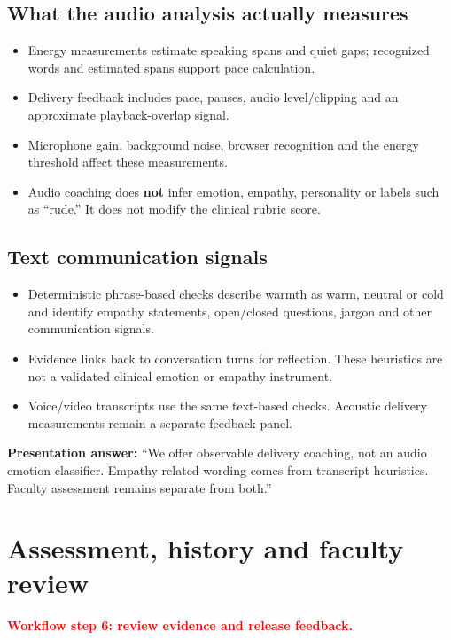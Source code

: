 \documentclass[10pt,letterpaper]{article}
\newcommand{\callout}[1]{\par\vspace{5pt}\noindent\colorbox{pale}{\parbox{\dimexpr\linewidth-2\fboxsep\relax}{\small #1}}\par\vspace{5pt}}
\newcommand{\page}[2]{\clearpage\section{#1}\textcolor{red}{\textbf{#2}}\par}
\begin{document}
\subsection*{What the audio analysis actually measures}
\begin{itemize}
\item Energy measurements estimate speaking spans and quiet gaps; recognized words and estimated spans support pace calculation.
\item Delivery feedback includes pace, pauses, audio level/clipping and an approximate playback-overlap signal.
\item Microphone gain, background noise, browser recognition and the energy threshold affect these measurements.
\item Audio coaching does \textbf{not} infer emotion, empathy, personality or labels such as ``rude.'' It does not modify the clinical rubric score.
\end{itemize}
\subsection*{Text communication signals}
\begin{itemize}
\item Deterministic phrase-based checks describe warmth as warm, neutral or cold and identify empathy statements, open/closed questions, jargon and other communication signals.
\item Evidence links back to conversation turns for reflection. These heuristics are not a validated clinical emotion or empathy instrument.
\item Voice/video transcripts use the same text-based checks. Acoustic delivery measurements remain a separate feedback panel.
\end{itemize}
\callout{\textbf{Presentation answer:} ``We offer observable delivery coaching, not an audio emotion classifier. Empathy-related wording comes from transcript heuristics. Faculty assessment remains separate from both.''}

\page{Assessment, history and faculty review}{Workflow step 6: review evidence and release feedback.}
\end{document}
